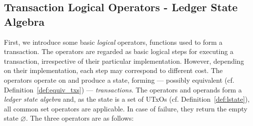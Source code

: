 \subsection{Transaction Logical Operators - Ledger State Algebra}\label{sec:logical-operators}

First, we introduce some basic \emph{logical} operators, \ie functions used to
form a transaction. The operators are regarded as basic logical steps for
executing a transaction, \ie irrespective of their particular implementation.
However, depending on their implementation, each step may correspond to
different cost. The operators operate on and produce a state, forming ---
possibly equivalent (cf. Definition~\ref{def:equiv_txs}) ---
\emph{transactions}. The operators and operands form a \emph{ledger state
algebra} and, as the state is a set of UTxOs (cf.
Definition~\ref{def:lstate}), all common set operators are applicable. In case
of failure, they return the empty state $\varnothing$. The three operators are
as follows:

